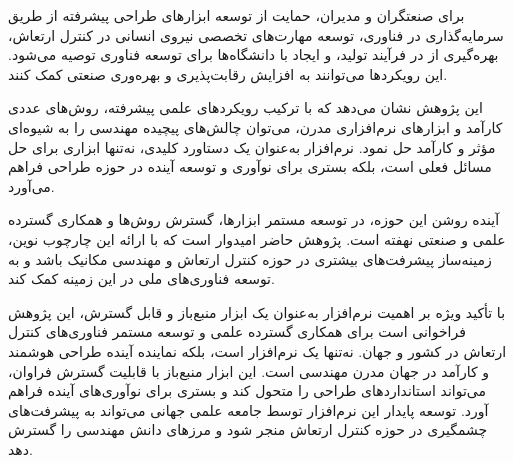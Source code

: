 برای صنعتگران و مدیران، حمایت از توسعه ابزارهای طراحی پیشرفته از طریق سرمایه‌گذاری در فناوری، توسعه مهارت‌های تخصصی نیروی انسانی در کنترل ارتعاش، بهره‌گیری از  در فرآیند تولید، و ایجاد  با دانشگاه‌ها برای توسعه فناوری توصیه می‌شود. این رویکردها می‌توانند به افزایش رقابت‌پذیری و بهره‌وری صنعتی کمک کنند.

این پژوهش نشان می‌دهد که با ترکیب رویکردهای علمی پیشرفته، روش‌های عددی کارآمد و ابزارهای نرم‌افزاری مدرن، می‌توان چالش‌های پیچیده مهندسی را به شیوه‌ای مؤثر و کارآمد حل نمود. نرم‌افزار  به‌عنوان یک دستاورد کلیدی، نه‌تنها ابزاری برای حل مسائل فعلی است، بلکه بستری برای نوآوری و توسعه آینده در حوزه طراحی  فراهم می‌آورد.

آینده روشن این حوزه، در توسعه مستمر ابزارها، گسترش روش‌ها و همکاری گسترده علمی و صنعتی نهفته است. پژوهش حاضر امیدوار است که با ارائه این چارچوب نوین، زمینه‌ساز پیشرفت‌های بیشتری در حوزه کنترل ارتعاش و مهندسی مکانیک باشد و به توسعه فناوری‌های ملی در این زمینه کمک کند.

با تأکید ویژه بر اهمیت نرم‌افزار  به‌عنوان یک ابزار منبع‌باز و قابل گسترش، این پژوهش فراخوانی است برای همکاری گسترده علمی و توسعه مستمر فناوری‌های کنترل ارتعاش در کشور و جهان.  نه‌تنها یک نرم‌افزار است، بلکه نماینده آینده طراحی هوشمند و کارآمد  در جهان مدرن مهندسی است. این ابزار منبع‌باز با قابلیت گسترش فراوان، می‌تواند استانداردهای طراحی را متحول کند و بستری برای نوآوری‌های آینده فراهم آورد. توسعه پایدار این نرم‌افزار توسط جامعه علمی جهانی می‌تواند به پیشرفت‌های چشمگیری در حوزه کنترل ارتعاش منجر شود و مرزهای دانش مهندسی را گسترش دهد.
